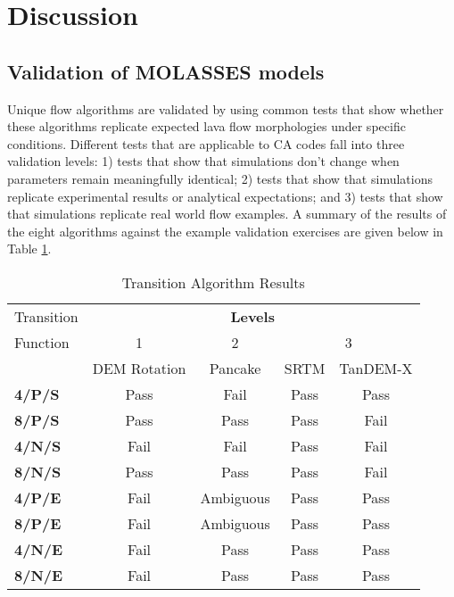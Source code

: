 
\section{Discussion}\label{sec:discussion}
	\subsection{Validation of MOLASSES models}
	Unique flow algorithms are validated by using common tests that show whether these algorithms replicate expected lava flow morphologies under specific conditions. Different tests that are applicable to CA codes fall into three validation levels: 1) tests that show that simulations don't change when parameters remain meaningfully identical; 2) tests that show that simulations replicate experimental results or analytical expectations; and 3) tests that show that simulations replicate real world flow examples. A summary of the results of the eight algorithms against the example validation exercises are given below in Table \ref{tab_algorithmresults}.
		
	\begin{table}[h]
		\centering
		\caption{Transition Algorithm Results}
		\begin{tabular}{l | c | c | c c}
			\toprule
			Transition&\multicolumn{4}{c}{\textbf{Levels}}\\
			Function&1&2&\multicolumn{2}{c}{3}\\
			& DEM Rotation & Pancake & SRTM & TanDEM-X \\
			\midrule
			\textbf{4/P/S} & Pass & Fail & Pass & Pass\\
			\textbf{8/P/S} & Pass & Pass & Pass & Fail\\
			\textbf{4/N/S} & Fail & Fail & Pass & Fail\\
			\textbf{8/N/S} & Pass & Pass& Pass & Fail\\
			\textbf{4/P/E} & Fail & Ambiguous & Pass & Pass\\
			\textbf{8/P/E} & Fail & Ambiguous & Pass & Pass\\
			\textbf{4/N/E} & Fail & Pass & Pass & Pass\\
			\textbf{8/N/E} & Fail & Pass & Pass & Pass\\
			
			\bottomrule
		\end{tabular}
		\label{tab_algorithmresults}
	\end{table}
	
